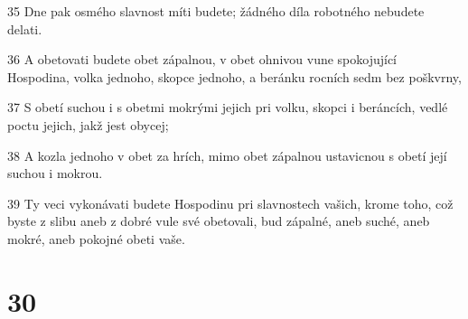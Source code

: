 \par 35 Dne pak osmého slavnost míti budete; žádného díla robotného nebudete delati.
\par 36 A obetovati budete obet zápalnou, v obet ohnivou vune spokojující Hospodina, volka jednoho, skopce jednoho, a beránku rocních sedm bez poškvrny,
\par 37 S obetí suchou i s obetmi mokrými jejich pri volku, skopci i beráncích, vedlé poctu jejich, jakž jest obycej;
\par 38 A kozla jednoho v obet za hrích, mimo obet zápalnou ustavicnou s obetí její suchou i mokrou.
\par 39 Ty veci vykonávati budete Hospodinu pri slavnostech vašich, krome toho, což byste z slibu aneb z dobré vule své obetovali, bud zápalné, aneb suché, aneb mokré, aneb pokojné obeti vaše.

\chapter{30}

